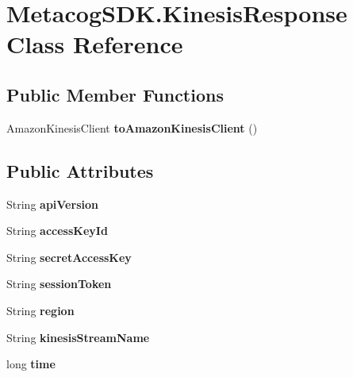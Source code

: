 \hypertarget{classMetacogSDK_1_1KinesisResponse}{}\section{Metacog\+S\+D\+K.\+Kinesis\+Response Class Reference}
\label{classMetacogSDK_1_1KinesisResponse}
\subsection*{Public Member Functions}
\begin{DoxyCompactItemize}
\item 
Amazon\+Kinesis\+Client {\bfseries to\+Amazon\+Kinesis\+Client} ()\hypertarget{classMetacogSDK_1_1KinesisResponse_a7ad03fb69b82c2e149b433ce44c12120}{}\label{classMetacogSDK_1_1KinesisResponse_a7ad03fb69b82c2e149b433ce44c12120}

\end{DoxyCompactItemize}
\subsection*{Public Attributes}
\begin{DoxyCompactItemize}
\item 
String {\bfseries api\+Version}\hypertarget{classMetacogSDK_1_1KinesisResponse_a7cb020e8457a56ea714b904fa16c97ad}{}\label{classMetacogSDK_1_1KinesisResponse_a7cb020e8457a56ea714b904fa16c97ad}

\item 
String {\bfseries access\+Key\+Id}\hypertarget{classMetacogSDK_1_1KinesisResponse_a4826e045c291c68a9271dda0d3899f17}{}\label{classMetacogSDK_1_1KinesisResponse_a4826e045c291c68a9271dda0d3899f17}

\item 
String {\bfseries secret\+Access\+Key}\hypertarget{classMetacogSDK_1_1KinesisResponse_a498923f6ef98a7f312e4e89499c0b4b5}{}\label{classMetacogSDK_1_1KinesisResponse_a498923f6ef98a7f312e4e89499c0b4b5}

\item 
String {\bfseries session\+Token}\hypertarget{classMetacogSDK_1_1KinesisResponse_a6f38ee2b00567d4df0d22eed6c91fc22}{}\label{classMetacogSDK_1_1KinesisResponse_a6f38ee2b00567d4df0d22eed6c91fc22}

\item 
String {\bfseries region}\hypertarget{classMetacogSDK_1_1KinesisResponse_a0d91e5bb5020dd037069b19b7fa5dc3d}{}\label{classMetacogSDK_1_1KinesisResponse_a0d91e5bb5020dd037069b19b7fa5dc3d}

\item 
String {\bfseries kinesis\+Stream\+Name}\hypertarget{classMetacogSDK_1_1KinesisResponse_aafafbf1f2f6f46427d8aaa76c3bc14e6}{}\label{classMetacogSDK_1_1KinesisResponse_aafafbf1f2f6f46427d8aaa76c3bc14e6}

\item 
long {\bfseries time}\hypertarget{classMetacogSDK_1_1KinesisResponse_a616c1e17ebf15225aaa26cd9d8c1f0d3}{}\label{classMetacogSDK_1_1KinesisResponse_a616c1e17ebf15225aaa26cd9d8c1f0d3}

\end{DoxyCompactItemize}


